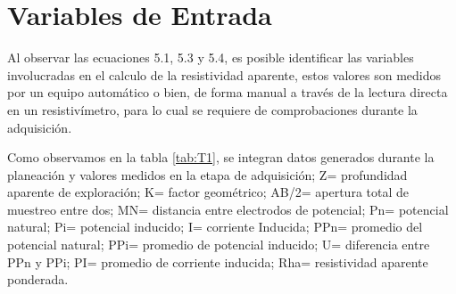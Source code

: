 \section{Variables de Entrada}
	Al observar las ecuaciones 5.1, 5.3 y 5.4, es posible identificar las variables involucradas en el calculo de la resistividad aparente, estos valores son medidos por un equipo automático o bien, de forma manual a través de la lectura directa en un resistivímetro, para lo cual se requiere de comprobaciones durante la adquisición.
		
	Como observamos en la tabla \ref{tab:T1}, se integran datos generados durante la planeación y valores medidos en la etapa de adquisición; Z= profundidad aparente de exploración; K= factor geométrico; AB/2= apertura total de muestreo entre dos;  MN= distancia entre electrodos de potencial; Pn= potencial natural; Pi= potencial inducido; I= corriente Inducida; PPn= promedio del potencial natural; PPi= promedio de potencial inducido; U= diferencia entre PPn y PPi; PI= promedio de corriente inducida; Rha= resistividad aparente ponderada.
	
	
	
